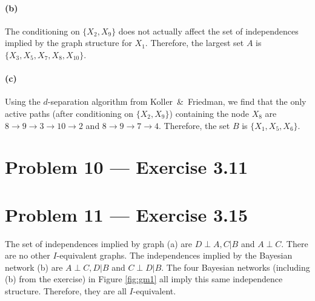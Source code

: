 \documentclass[11pt]{article}
\newcommand{\fig}[1]{Figure \ref{fig:#1}}
\begin{document}
\paragraph{(b)}

The conditioning on $\{ X_2, X_9 \}$ does not actually affect the set of
independences implied by the graph structure for $X_1$.  Therefore, the
largest set $A$ is $\{ X_3, X_5, X_7, X_8, X_{10} \}$.

\paragraph{(c)}

Using the $d$-separation algorithm from Koller~\&~Friedman, we find that the
only active paths (after conditioning on $\{ X_2, X_9 \}$) containing the node
$X_8$ are $8 \to 9 \to 3 \to 10 \to 2$ and $8 \to 9 \to 7 \to 4$.  Therefore,
the set $B$ is $\{ X_1, X_5, X_6 \}$.

\section{Problem 10 --- Exercise 3.11}

\section{Problem 11 --- Exercise 3.15}

The set of independences implied by graph (a) are $D \perp A,C | B$ and
$A \perp C$. There are no other $I$-equivalent graphs.
The independences implied by the Bayesian network (b) are $A \perp C,D|B$ and
$C \perp D | B$.  The four Bayesian networks (including (b) from the exercise)
in \fig{gm1} all imply this same independence structure. Therefore, they
are all $I$-equivalent.
\end{document}
